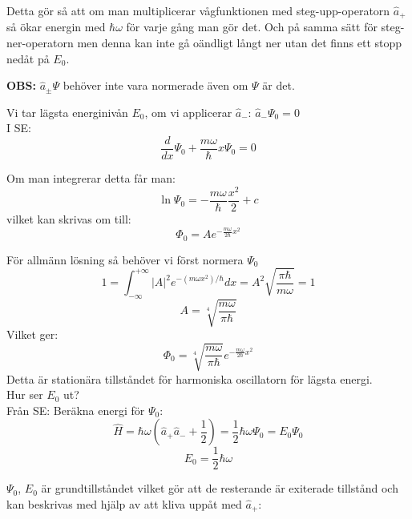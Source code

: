 \documentclass{article}
\begin{document}
Detta gör så att om man multiplicerar vågfunktionen med steg-upp-operatorn $\hat{a}_+$ så ökar energin med $\hbar\omega$ för varje gång man gör det. Och på samma sätt för steg-ner-operatorn men denna kan inte gå oändligt långt ner utan det finns ett stopp nedåt på $E_0$.

\textbf{OBS:} $\hat{a}_{\pm}\Psi$ behöver inte vara normerade även om $\Psi$ är det.

Vi tar lägsta energinivån $E_0$, om vi applicerar $\hat{a}_-$: $\hat{a}_-\Psi_0=0$\\

I SE:
\begin{equation}
  \frac{d}{dx}\Psi_0+\frac{m\omega}{\hbar}x\Psi_0=0
\end{equation}

Om man integrerar detta får man:
\begin{equation}
  \ln{\Psi_0}=-\frac{m\omega}{\hbar}\frac{x^2}{2}+c
\end{equation}
vilket kan skrivas om till:
\begin{equation}
  \Phi_0=Ae^{-\frac{m\omega}{2\hbar}x^2}
\end{equation}

För allmänn lösning så behöver vi först normera $\Psi_0$
\begin{equation}
  1=\int_{-\infty}^{+\infty}|A|^2e^{-(m\omega x^2)/\hbar}dx=A^2\sqrt{\frac{\pi\hbar}{m\omega}}=1
\end{equation}
\begin{equation}
  A =\sqrt[4]{\frac{m\omega}{\pi\hbar}}
\end{equation}
Vilket ger:
\begin{equation}
  \Phi_0=\sqrt[4]{\frac{m\omega}{\pi\hbar}}e^{-\frac{m\omega}{2\hbar}x^2}
\end{equation}
Detta är stationära tillståndet för harmoniska oscillatorn för lägsta energi.\\

Hur ser $E_0$ ut?\\
Från SE: Beräkna energi för $\Psi_0$:
\begin{equation}
  \hat{H}=\hbar\omega(\hat{a}_+\hat{a}_-+\frac{1}{2})=\frac{1}{2}\hbar\omega\Psi_0=E_0\Psi_0
\end{equation}
\begin{equation}
  E_0=\frac{1}{2}\hbar\omega
\end{equation}

$\Psi_0$, $E_0$ är grundtillståndet vilket gör att de resterande är exiterade tillstånd och kan beskrivas med hjälp av att kliva uppåt med $\hat{a}_+$:\\
\end{document}
